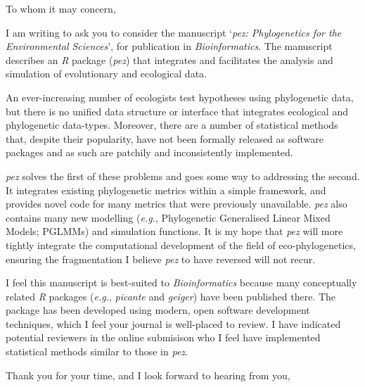 \documentclass[fontsize=12pt, paper=a4]{scrlttr2}
\begin{document}
\begin{letter}

\opening{To whom it may concern,}\enlargethispage{8\baselineskip}

I am writing to ask you to consider the manuscript `\emph{pez:
  Phylogenetics for the Environmental Sciences}', for publication in
\emph{Bioinformatics}. The manuscript describes an \emph{R} package
(\emph{pez}) that integrates and facilitates the analysis and
simulation of evolutionary and ecological data.


An ever-increasing number of ecologists test hypotheses using
phylogenetic data, but there is no unified data structure or interface
that integrates ecological and phylogenetic data-types. Moreover,
there are a number of statistical methods that, despite their
popularity, have not been formally released as software packages and
as such are patchily and inconsistently implemented.

\emph{pez} solves the first of these problems and goes some way to
addressing the second. It integrates existing phylogenetic metrics
within a simple framework, and provides novel code for many metrics
that were previously unavailable. \emph{pez} also contains many new
modelling (\emph{e.g.}, Phylogenetic Generalised Linear Mixed Models;
PGLMMs) and simulation functions. It is my hope that \emph{pez} will
more tightly integrate the computational development of the field of
eco-phylogenetics, ensuring the fragmentation I believe \emph{pez} to
have reversed will not recur.

I feel this manuscript is best-suited to \emph{Bioinformatics} because
many conceptually related \emph{R} packages (\emph{e.g.},
\emph{picante} and \emph{geiger}) have been published there. The
package has been developed using modern, open software development
techniques, which I feel your journal is well-placed to review. I have
indicated potential reviewers in the online submisison who I feel have
implemented statistical methods similar to those in \emph{pez}.

\closing{Thank you for your time, and I look forward to hearing from
  you,\vspace{20pt}}

\end{letter}
\end{document}

